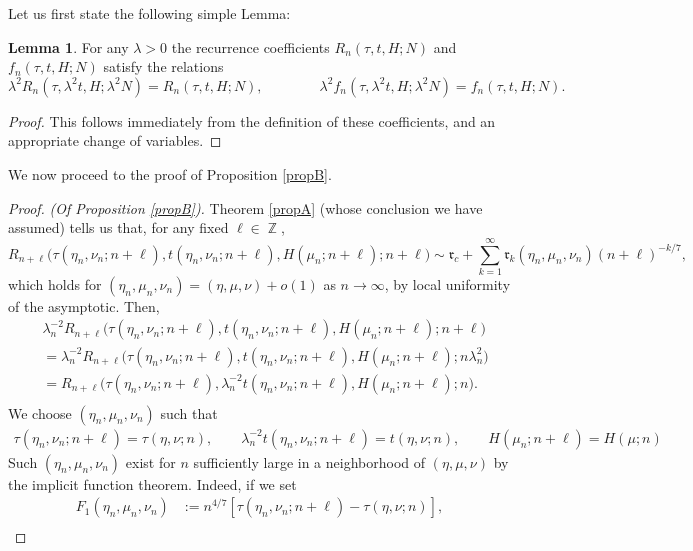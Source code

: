\documentclass[usenames,dvipsnames]{article}
\theoremstyle{definition}
\newtheorem{lemma}{Lemma}[section]
\DeclareMathOperator{\ZZ}{\mathbb{Z}}
\numberwithin{equation}{section}
\numberwithin{figure}{section}
\begin{document}
Let us first state the following simple Lemma:
\begin{lemma}
    For any $\lambda >0$ the recurrence coefficients $R_n(\tau,t,H;N)$ and $f_n(\tau,t,H;N)$ satisfy the relations
    \begin{equation}
       \lambda^2R_n(\tau,\lambda^2t,H;\lambda^{2}N) = R_n(\tau,t,H;N),\qquad\qquad \lambda^2f_n(\tau,\lambda^2t,H;\lambda^{2}N) = f_n(\tau,t,H;N).
    \end{equation}
\end{lemma}
\begin{proof}
    This follows immediately from the definition of these coefficients, and an appropriate change of variables.
\end{proof}
    We now proceed to the proof of  Proposition \ref{propB}.
\begin{proof}\textit{(Of  Proposition \ref{propB}).}
    Theorem \ref{propA} (whose conclusion we have assumed) tells us that, for any fixed $\ell\in \ZZ$,
        \begin{equation*}
        R_{n+\ell}\bigg(\tau(\eta_n,\nu_n;n+\ell),t(\eta_n,\nu_n;n+\ell),H(\mu_n;n+\ell);n+\ell\bigg) \sim \mathfrak{r}_c + \sum_{k=1}^{\infty}\mathfrak{r}_k(\eta_n,\mu_n,\nu_n)(n+\ell)^{-k/7},
    \end{equation*}
    which holds for $(\eta_n,\mu_n,\nu_n) = (\eta,\mu,\nu) + o(1)$ as $n\to \infty$, by local uniformity of the asymptotic. Then,
    \begin{align*}
        &\lambda_n^{-2}R_{n+\ell}\bigg(\tau(\eta_n,\nu_n;n+\ell),t(\eta_n,\nu_n;n+\ell),H(\mu_n;n+\ell);n+\ell\bigg)\\
        &=\lambda_n^{-2} R_{n+\ell}\bigg(\tau(\eta_n,\nu_n;n+\ell),t(\eta_n,\nu_n;n+\ell),H(\mu_n;n+\ell);n\lambda_n^2\bigg)\\
        &=R_{n+\ell}\bigg(\tau(\eta_n,\nu_n;n+\ell),\lambda_n^{-2}t(\eta_n,\nu_n;n+\ell),H(\mu_n;n+\ell);n\bigg).\\
    \end{align*}
We choose $(\eta_n,\mu_n,\nu_n)$ such that
    \begin{align*}
        \tau(\eta_n,\nu_n;n+\ell) = \tau(\eta,\nu;n), \qquad \lambda_n^{-2}t(\eta_n,\nu_n;n+\ell) = t(\eta,\nu;n),\qquad H(\mu_n;n+\ell) = H(\mu;n)
    \end{align*}
Such $(\eta_n,\mu_n,\nu_n)$ exist for $n$ sufficiently large in a neighborhood of $(\eta,\mu,\nu)$ by the implicit function theorem. Indeed, if we set
    \begin{align*}
        F_1(\eta_n,\mu_n,\nu_n)&:=n^{4/7}[\tau(\eta_n,\nu_n;n+\ell) -\tau(\eta,\nu;n)],\\

\end{align*}
\end{proof}
\end{document}
